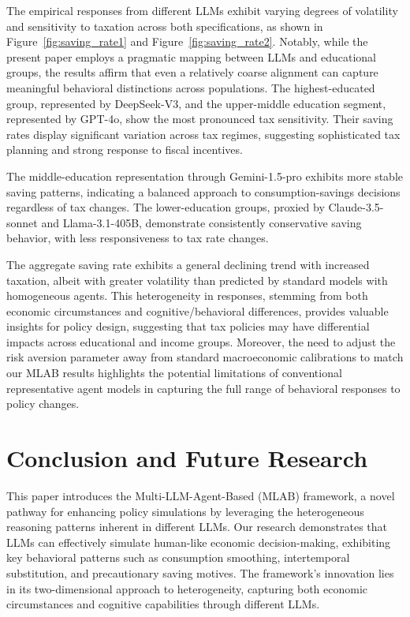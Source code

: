 \documentclass[12pt]{article}
\begin{document}
\begin{CJK*}{UTF8}{gbsn}
The empirical responses from different LLMs exhibit varying degrees of volatility and sensitivity to taxation across both specifications, as shown in Figure~\ref{fig:saving_rate1} and Figure~\ref{fig:saving_rate2}. Notably, while the present paper employs a pragmatic mapping between LLMs and educational groups, the results affirm that even a relatively coarse alignment can capture meaningful behavioral distinctions across populations. The highest-educated group, represented by DeepSeek-V3, and the upper-middle education segment, represented by GPT-4o, show the most pronounced tax sensitivity. Their saving rates display significant variation across tax regimes, suggesting sophisticated tax planning and strong response to fiscal incentives.

The middle-education representation through Gemini-1.5-pro exhibits more stable saving patterns, indicating a balanced approach to consumption-savings decisions regardless of tax changes.  
The lower-education groups, proxied by Claude-3.5-sonnet and Llama-3.1-405B, demonstrate consistently conservative saving behavior, with less responsiveness to tax rate changes. 

The aggregate saving rate exhibits a general declining trend with increased taxation, albeit with greater volatility than predicted by standard models with homogeneous agents. This heterogeneity in responses, stemming from both economic circumstances and cognitive/behavioral differences, provides valuable insights for policy design, suggesting that tax policies may have differential impacts across educational and income groups. Moreover, the need to adjust the risk aversion parameter away from standard macroeconomic calibrations to match our MLAB results highlights the potential limitations of conventional representative agent models in capturing the full range of behavioral responses to policy changes.

\section{Conclusion and Future Research}

This paper introduces the Multi-LLM-Agent-Based (MLAB) framework, a novel pathway for enhancing policy simulations by leveraging the heterogeneous reasoning patterns inherent in different LLMs. Our research demonstrates that LLMs can effectively simulate human-like economic decision-making, exhibiting key behavioral patterns such as consumption smoothing, intertemporal substitution, and precautionary saving motives. The framework's innovation lies in its two-dimensional approach to heterogeneity, capturing both economic circumstances and cognitive capabilities through different LLMs.


\end{CJK*}
\end{document}
